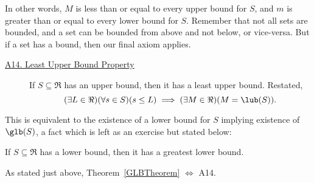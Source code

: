 In other words, $M$ is less than or equal to every upper bound
for $S$, and $m$ is greater than or equal to every lower bound for $S$.
Remember that not all sets are bounded, and a set can be bounded
from above and not below, or vice-versa.  But if a set has a
bound, then our final axiom applies.
\begin{description}
\item[\ul{A14. Least Upper Bound Property}]
If $S\subseteq \Re$ has an upper bound, then it has
a least upper bound.  Restated,
\begin{equation}
(\exists L\in\Re)(\forall s\in S)(s\le L)\implies
(\exists M\in \Re)(M=\lub(S)).\end{equation} 
\end{description}
This is equivalent to the existence of a lower bound for $S$ implying
existence of $\glb(S)$,  a fact which is left as an exercise
but stated below:
\begin{theorem}
If $S\subseteq\Re$ has a lower bound, then it has a greatest lower
bound.\label{GLBTheorem}\end{theorem}
As stated just above, Theorem~\ref{GLBTheorem} $\iff$ A14.
\label{GLBPage}


